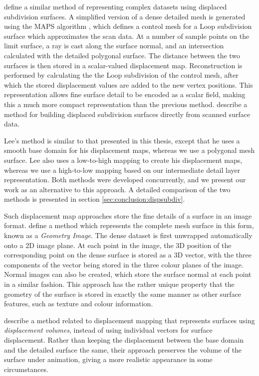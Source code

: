 \citet{Lee00} define a similar method of representing complex datasets using displaced subdivision surfaces. A simplified version of a dense detailed mesh is generated using the MAPS algorithm \cite{Lee99}, which defines a control mesh for a Loop subdivision surface which approximates the scan data. At a number of sample points on the limit surface, a ray is cast along the surface normal, and an intersection calculated with the detailed polygonal surface. The distance between the two surfaces is then stored in a scalar-valued displacement map. Reconstruction is performed by calculating the the Loop subdivision of the control mesh, after which the stored displacement values are added to the new vertex positions. This representation allows fine surface detail to be encoded as a scalar field, making this a much more compact representation than the previous method. \citet{Jeong01} describe a method for building displaced subdivision surfaces directly from scanned surface data.

Lee's method is similar to that presented in this thesis, except that he uses a smooth base domain for his displacement maps, whereas we use a polygonal mesh surface. Lee also uses a low-to-high mapping to create his displacement maps, whereas we use a high-to-low mapping based on our intermediate detail layer representation. Both methods were developed concurrently, and we present our work as an alternative to this approach. A detailed comparison of the two methods is presented in section \ref{sec:conclusion:dispsubdiv}.

Such displacement map approaches store the fine details of a surface in an image format. \citet{Gu02} define a method which represents the complete mesh surface in this form, known as a {\it Geometry Image}. The dense dataset is first unwrapped automatically onto a 2D image plane. At each point in the image, the 3D position of the corresponding point on the dense surface is stored as a 3D vector, with the three components of the vector being stored in the three colour planes of the image. Normal images can also be created, which store the surface normal at each point in a similar fashion. This approach has the rather unique property that the geometry of the surface is stored in exactly the same manner as other surface features, such as texture and colour information.

\citet{Botsch03} describe a method related to displacement mapping that represents surfaces using {\it displacement volumes}, instead of using individual vectors for surface displacement. Rather than keeping the displacement between the base domain and the detailed surface the same, their approach preserves the volume of the surface under animation, giving a more realistic appearance in some circumstances.

